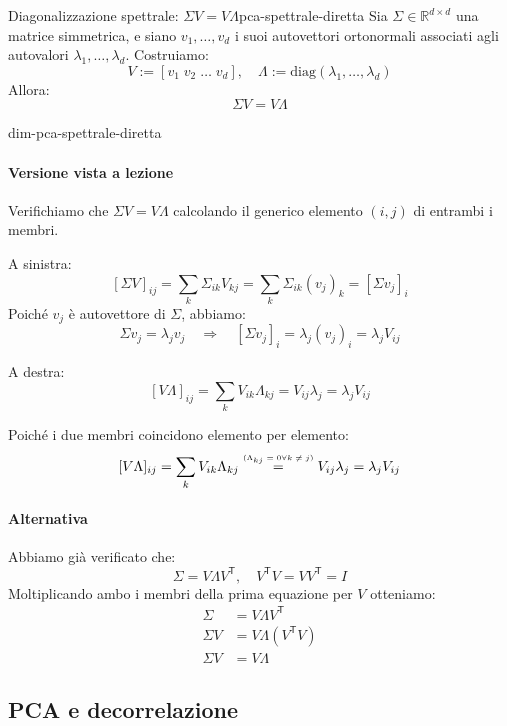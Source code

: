 \begin{proposizione}{Diagonalizzazione spettrale: \texorpdfstring{\( \Sigma V =
V \Lambda \)}{Sigma V = V Lambda}}{pca-spettrale-diretta}
Sia \( \Sigma \in \mathbb{R}^{d \times d} \) una matrice simmetrica, e siano \(
v_1, \dots, v_d \) i suoi autovettori ortonormali associati agli autovalori \(
\lambda_1, \dots, \lambda_d \). Costruiamo:
\[
V := [v_1 \; v_2 \; \dots \; v_d], \quad \Lambda := \mathrm{diag}(\lambda_1,
\dots, \lambda_d)
\]
Allora:
\[
\Sigma V = V \Lambda
\]
\end{proposizione}

\begin{dimostrazione}{}{dim-pca-spettrale-diretta}
    \paragraph{Versione vista a lezione} Verifichiamo che \( \Sigma V = V
    \Lambda \) calcolando il generico elemento \( (i, j) \) di entrambi i
    membri.

A sinistra:
\[
[\Sigma V]_{ij} = \sum_k \Sigma_{ik} V_{kj}
= \sum_k \Sigma_{ik} (v_j)_k = [\Sigma v_j]_i
\]
Poiché \( v_j \) è autovettore di \( \Sigma \), abbiamo:
\[
\Sigma v_j = \lambda_j v_j \quad \Rightarrow \quad [\Sigma v_j]_i = \lambda_j
(v_j)_i = \lambda_j V_{ij}
\]

A destra:
\[
[V \Lambda]_{ij} = \sum_k V_{ik} \Lambda_{kj} = V_{ij} \lambda_j = \lambda_j
V_{ij}
\]

Poiché i due membri coincidono elemento per elemento:
\[
    [V \Lambda]_{ij} = \sum_k V_{ik} \Lambda_{kj} \stackrel{\text{\tiny
    (\(\Lambda_{kj} = 0 \forall k \neq j\))}}{=} V_{ij} \lambda_j = \lambda_j
    V_{ij}
\]

\paragraph{Alternativa}

Abbiamo già verificato che:
\[
\Sigma = V \Lambda V^\mathsf{T} ,\quad V^\mathsf{T}V = VV^\mathsf{T} = I
\]
Moltiplicando ambo i membri della prima equazione per $V$ otteniamo:
\begin{align*}
    \Sigma &= V \Lambda V^\mathsf{T} \\
    \Sigma V &= V \Lambda (V^\mathsf{T} V) \\
    \Sigma V &= V \Lambda
\end{align*}
\end{dimostrazione}

\subsection{PCA e decorrelazione}

